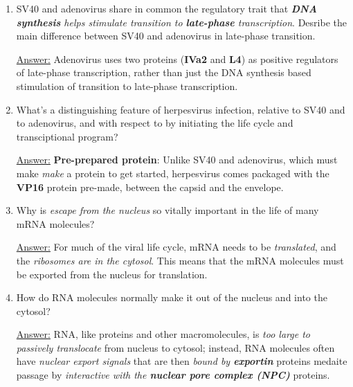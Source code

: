 \documentclass{article}
\newenvironment{QandA}{\begin{enumerate}[label=\bfseries Q\arabic*.]}
                       {\end{enumerate}}
\newenvironment{answered}{\par\normalfont\underline{Answer:}}{}
\begin{document}
\begin{QandA}
\begin{answered}
\begin{itemize}
      \item{\textit{\textbf{Rb} recruits HDACs}, so the eviction of Rb from a locus an allow histone acetylation and gene activation, which can promote \textit{cell division and \textbf{cancer}}.}
    \end{itemize}
    \end{answered}
  \item{SV40 and adenovirus share in common the regulatory trait that \textit{\textbf{DNA synthesis} helps stimulate transition to \textbf{late-phase} transcription}. Desribe the main difference between SV40 and adenovirus in late-phase transition.}
    \begin{answered}
    Adenovirus uses two proteins (\textbf{IVa2} and \textbf{L4}) as positive regulators of late-phase transcription, rather than just the DNA synthesis based stimulation of transition to late-phase transcription.
    \end{answered}
  \item{What's a distinguishing feature of herpesvirus infection, relative to SV40 and to adenovirus, and with respect to  by initiating the life cycle and transciptional program?}
    \begin{answered}
    \textbf{Pre-prepared protein}: Unlike SV40 and adenovirus, which must make \textit{make} a protein to get started, herpesvirus comes packaged with the \textbf{VP16} protein pre-made, between the capsid and the envelope.
    \end{answered}
  \item{Why is \textit{escape from the nucleus} so vitally important in the life of many mRNA molecules?}
    \begin{answered}
    For much of the viral life cycle, mRNA needs to be \textit{translated}, and the \textit{ribosomes are in the cytosol}. This means that the mRNA molecules must be exported from the nucleus for translation.
    \end{answered}
  \item{How do RNA molecules normally make it out of the nucleus and into the cytosol?}
    \begin{answered}
    RNA, like proteins and other macromolecules, is \textit{too large to passively translocate} from nucleus to cytosol; instead, RNA molecules often have \textit{nuclear export signals} that are then \textit{bound by \textbf{exportin}} proteins medaite passage by \textit{interactive with the \textbf{nuclear pore complex (NPC)}} proteins.
    \end{answered}

\end{QandA}
\end{document}
